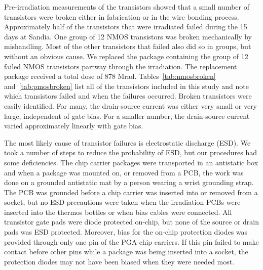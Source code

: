 Pre-irradiation measurements of the transistors showed that a small number of transistors were broken either in fabrication or in the wire bonding process.  Approximately half of the transistors that were irradiated failed during the 15 days at Sandia.  One group of 12 NMOS transistors was broken mechanically by mishandling.
Most of the other transistors that failed also did so in groups, but without an obvious cause.  We replaced the package containing the group of 12 failed NMOS transistors
partway through the irradiation.  The replacement package received a total dose of 878 Mrad.
Tables~\ref{tab:nmosbroken} and~\ref{tab:pmosbroken} list all of the transistors included in this study and note which transistors failed and when the failures occurred.
Broken transistors were easily identified.  For many, the drain-source current was either very small or very large, independent of gate bias.  For a smaller number, the drain-source current varied approximately linearly with gate bias.


The most likely cause of transistor failures is electrostatic discharge (ESD).  We took a number of steps to reduce the probability of ESD, but our procedures had some deficiencies.  The chip carrier packages were transported in an antistatic box and when a package was mounted on, or removed from a PCB, the work was done on a grounded antistatic mat by a person wearing a wrist grounding strap.  The PCB was grounded before a chip carrier was inserted into or removed from a socket, but no ESD precautions were taken when the irradiation PCBs were inserted into the thermos bottles or when bias cables were connected.  All transistor gate pads were diode protected on-chip, but none of the source or drain pads was ESD protected.  Moreover, bias for the on-chip protection diodes was provided through only one pin of the PGA chip carriers.  If this pin failed to make contact before other pins while a package was being inserted into a socket, the protection diodes may not have been biased when they were needed most.

